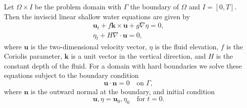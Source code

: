 Let $\Omega \times I$ be the problem domain with $\Gamma$ the boundary of
$\Omega$ and $I = [0, T]$.  Then the inviscid linear shallow water equations are
given by \cite{Hanert2004, LeBlond1981, Le-Roux1998}
\begin{equation}
  \begin{split}
    \mathbf{u}_t + f\mathbf{k} \times \mathbf{u} + g \nabla \eta = 0, \\
    \eta_t + H \nabla\cdot \mathbf{u} = 0,
  \end{split}
  \label{eqn:SWE}
\end{equation}
where $\mathbf{u}$ is the two-dimensional velocity vector, $\eta$ is the
fluid elevation, $f$ is the Coriolis parameter, $\mathbf{k}$ is a unit
vector in the vertical direction, and $H$ is the constant depth of the fluid.
For a domain with hard boundaries we solve these equations subject to the
boundary condition
\begin{equation}
  \mathbf{u}\cdot \mathbf{n} = 0 \quad \text{on } \Gamma,
  \label{eqn:BCs}
\end{equation}
where $\mathbf{n}$ is the outward normal at the boundary,
and initial condition
\begin{equation}
  \mathbf{u}, \eta = \mathbf{u}_0, \eta_0 \quad \text{for } t = 0.
  \label{eqn:IC}
\end{equation}

